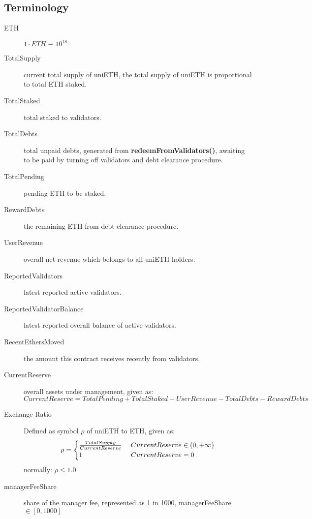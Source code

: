 \documentclass{article}
\begin{document}
\subsection{Terminology}
\begin{description}
   \item[ETH] $1\cdot ETH \equiv 10^{18}$
   \item[TotalSupply] current total supply of uniETH, the total supply of uniETH is proportional to total ETH staked.
   \item[TotalStaked] total 
 staked to validators.
   \item[TotalDebts] total unpaid debts, generated from \textbf{redeemFromValidators()}, awaiting to be paid by turning off validators and debt clearance procedure.
   \item[TotalPending] pending ETH to be staked.
   \item[RewardDebts] the remaining ETH from debt clearance procedure.
   \item[UserRevenue] overall net revenue which belongs to all uniETH holders.
   \item[ReportedValidators] latest reported active validators.
   \item[ReportedValidatorBalance] latest reported overall balance of active validators.
   \item[RecentEthersMoved] the amount this contract receives recently from validators.
   \item[CurrentReserve] overall assets under management, given as:
   \[CurrentReserve = TotalPending + TotalStaked + UserRevenue - TotalDebts - RewardDebts\]
   \item[Exchange Ratio] Defined as symbol $\rho$ of uniETH to ETH, given as: 
   \begin{equation}
    \rho = \begin{cases}
        \frac{TotalSupply}{CurrentReserve} & \text{ $ CurrentReserve \in (0, +\infty) $}\\
        1 & \text{ $ CurrentReserve = 0 $}
    \end{cases}
    \end{equation}
    normally: $\rho \leq 1.0$
   \item[managerFeeShare] share of the manager fee, represented as 1 in 1000, managerFeeShare $\in[0,1000]$ 
\end{description}

\newtheorem{theorem}{Theorem}[section]
\newtheorem{corollary}{Corollary}[theorem]
\newtheorem{lemma}[theorem]{Lemma}
\end{document}

